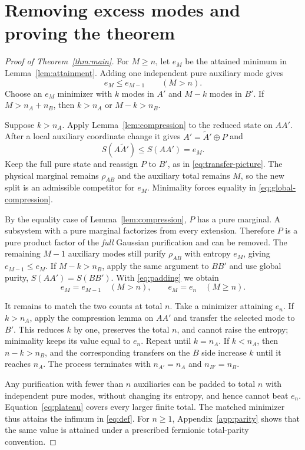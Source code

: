 \documentclass[11pt,a4paper]{article}
\numberwithin{equation}{section}
\theoremstyle{remark}
\begin{document}
\section{Removing excess modes and proving the theorem}\label{sec:global}
\begin{proof}[Proof of Theorem~\ref{thm:main}]
For $M\ge n$, let $e_M$ be the attained minimum in Lemma~\ref{lem:attainment}. Adding one independent pure auxiliary mode gives
\begin{equation}\label{eq:padding}
 e_M\le e_{M-1}\qquad(M>n).
\end{equation}
Choose an $e_M$ minimizer with $k$ modes in $A'$ and $M-k$ modes in $B'$. If $M>n_A+n_B$, then $k>n_A$ or $M-k>n_B$.

Suppose $k>n_A$. Apply Lemma~\ref{lem:compression} to the reduced state on $AA'$. After a local auxiliary coordinate change it gives $A'=\widetilde A'\oplus P$ and
\begin{equation}\label{eq:global-compression}
 S(A\widetilde A')\le S(AA')=e_M.
\end{equation}
Keep the full pure state and reassign $P$ to $B'$, as in \eqref{eq:transfer-picture}. The physical marginal remains $\rho_{AB}$ and the auxiliary total remains $M$, so the new split is an admissible competitor for $e_M$. Minimality forces equality in \eqref{eq:global-compression}.

By the equality case of Lemma~\ref{lem:compression}, $P$ has a pure marginal. A subsystem with a pure marginal factorizes from every extension. Therefore $P$ is a pure product factor of the \emph{full} Gaussian purification and can be removed. The remaining $M-1$ auxiliary modes still purify $\rho_{AB}$ with entropy $e_M$, giving $e_{M-1}\le e_M$. If $M-k>n_B$, apply the same argument to $BB'$ and use global purity, $S(AA')=S(BB')$. With \eqref{eq:padding} we obtain
\begin{equation}\label{eq:plateau}
 e_M=e_{M-1}\quad(M>n),\qquad e_M=e_n\quad(M\ge n).
\end{equation}

It remains to match the two counts at total $n$. Take a minimizer attaining $e_n$. If $k>n_A$, apply the compression lemma on $AA'$ and transfer the selected mode to $B'$. This reduces $k$ by one, preserves the total $n$, and cannot raise the entropy; minimality keeps its value equal to $e_n$. Repeat until $k=n_A$. If $k<n_A$, then $n-k>n_B$, and the corresponding transfers on the $B$ side increase $k$ until it reaches $n_A$. The process terminates with $n_{A'}=n_A$ and $n_{B'}=n_B$.

Any purification with fewer than $n$ auxiliaries can be padded to total $n$ with independent pure modes, without changing its entropy, and hence cannot beat $e_n$. Equation~\eqref{eq:plateau} covers every larger finite total. The matched minimizer thus attains the infimum in \eqref{eq:def}. For $n\ge1$, Appendix~\ref{app:parity} shows that the same value is attained under a prescribed fermionic total-parity convention.
\end{proof}
\end{document}
